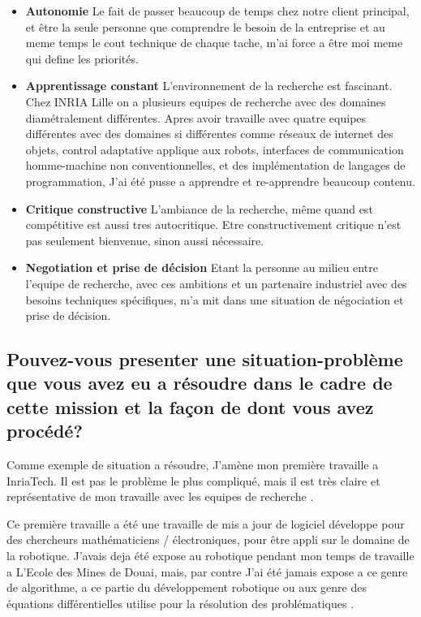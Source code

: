 \documentclass{resume} %
\begin{document}
			\begin{itemize} 				
			\item \textbf{Autonomie} \newline
				Le fait de passer beaucoup de temps chez notre client principal, et être la seule personne que comprendre le besoin de la entreprise et au meme temps le cout technique de chaque tache, m'ai force a être moi meme qui define les priorités. 
			\item \textbf{Apprentissage constant } \newline
				L'environnement de la recherche est fascinant. Chez INRIA Lille on a plusieurs equipes de recherche avec des domaines diamétralement différentes. Apres avoir travaille avec quatre equipes différentes avec des domaines si différentes comme réseaux de internet des objets, control adaptative applique aux robots,  interfaces de communication homme-machine non conventionnelles, et des implémentation de langages de programmation, J'ai été pusse a apprendre et re-apprendre beaucoup contenu. 
			\item \textbf{Critique constructive} \newline
				L'ambiance de la recherche, même quand est compétitive est aussi tres autocritique. Etre constructivement critique n'est pas seulement bienvenue, sinon aussi nécessaire.
			\item \textbf{Negotiation et prise de décision } \newline
				Etant la personne au milieu entre l'equipe de recherche, avec ces ambitions et un partenaire industriel avec des besoins techniques spécifiques, m'a mit dans une situation de négociation  et prise de décision. 
		\end{itemize}

		
	\subsection{Pouvez-vous presenter une situation-problème que vous avez eu a résoudre dans le cadre de cette mission et la façon de dont vous avez procédé?}
	
		Comme exemple de situation a résoudre, J'amène mon première travaille a InriaTech. Il est pas le problème le plus compliqué, mais il est très claire et représentative de mon travaille avec les equipes de recherche .  
		
		 Ce première travaille a été une travaille de mis a jour de logiciel développe pour des chercheurs mathématiciens / électroniques, pour être appli sur le domaine de la robotique. 
		J'avais deja été expose au robotique pendant mon temps de travaille a L'Ecole des Mines de Douai, mais, par contre J'ai été jamais expose a ce genre de algorithme, a ce partie du développement robotique ou aux genre des équations différentielles utilise pour la résolution des problématiques . 
		
\end{document}
